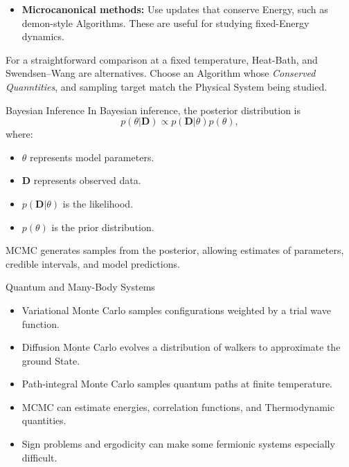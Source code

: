 \documentclass[a4paper, 10pt, onepage]{elegantbook}
\begin{document}
{\begin{itemize}
  \item \textbf{Microcanonical methods:}
  Use updates that conserve Energy, such as demon-style Algorithms.
  These are useful for studying fixed-Energy dynamics.
\end{itemize}

For a straightforward comparison at a fixed temperature, Heat-Bath, and
Swendsen--Wang are alternatives. Choose an Algorithm whose
\emph{Conserved Quanntities}, and sampling target match the Physical System
being studied.


\begin{frame}{Bayesian Inference}
  In Bayesian inference, the posterior distribution is
  \[
    p(\theta|\mathbf{D})
    \propto
    p(\mathbf{D}|\theta)p(\theta),
  \]
  where:
  \begin{itemize}
    \item \(\theta\) represents model parameters.
    \item \(\mathbf{D}\) represents observed data.
    \item \(p(\mathbf{D}|\theta)\) is the likelihood.
    \item \(p(\theta)\) is the prior distribution.
  \end{itemize}

  MCMC generates samples from the posterior, allowing estimates of parameters, credible intervals, and model 
predictions.
\end{frame}

\begin{frame}{Quantum and Many-Body Systems}
  \begin{itemize}
    \item Variational Monte Carlo samples configurations weighted by a trial wave function.
    \item Diffusion Monte Carlo evolves a distribution of walkers to approximate the ground State.
    \item Path-integral Monte Carlo samples quantum paths at finite temperature.
    \item MCMC can estimate energies, correlation functions, and Thermodynamic quantities.
    \item Sign problems and ergodicity can make some fermionic systems especially difficult.
  \end{itemize}
\end{frame}

}
\end{document}

